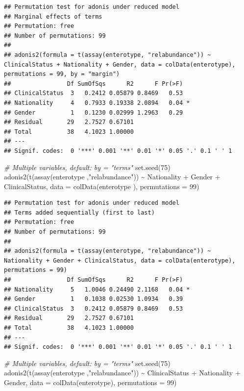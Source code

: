 \documentclass[
]{book}
\newenvironment{Shaded}{\begin{snugshade}}{\end{snugshade}}
\newcommand{\AttributeTok}[1]{\textcolor[rgb]{0.77,0.63,0.00}{#1}}
\newcommand{\CommentTok}[1]{\textcolor[rgb]{0.56,0.35,0.01}{\textit{#1}}}
\newcommand{\DecValTok}[1]{\textcolor[rgb]{0.00,0.00,0.81}{#1}}
\newcommand{\FunctionTok}[1]{\textcolor[rgb]{0.00,0.00,0.00}{#1}}
\newcommand{\NormalTok}[1]{#1}
\newcommand{\SpecialCharTok}[1]{\textcolor[rgb]{0.00,0.00,0.00}{#1}}
\newcommand{\StringTok}[1]{\textcolor[rgb]{0.31,0.60,0.02}{#1}}
\begin{document}
\begin{verbatim}
## Permutation test for adonis under reduced model
## Marginal effects of terms
## Permutation: free
## Number of permutations: 99
## 
## adonis2(formula = t(assay(enterotype, "relabundance")) ~ ClinicalStatus + Nationality + Gender, data = colData(enterotype), permutations = 99, by = "margin")
##                Df SumOfSqs      R2      F Pr(>F)  
## ClinicalStatus  3   0.2412 0.05879 0.8469   0.53  
## Nationality     4   0.7933 0.19338 2.0894   0.04 *
## Gender          1   0.1230 0.02999 1.2963   0.29  
## Residual       29   2.7527 0.67101                
## Total          38   4.1023 1.00000                
## ---
## Signif. codes:  0 '***' 0.001 '**' 0.01 '*' 0.05 '.' 0.1 ' ' 1
\end{verbatim}

\begin{Shaded}
\begin{Highlighting}[]
\CommentTok{\# Multiple variables, default: by = "terms"}
\FunctionTok{set.seed}\NormalTok{(}\DecValTok{75}\NormalTok{)}
\FunctionTok{adonis2}\NormalTok{(}\FunctionTok{t}\NormalTok{(}\FunctionTok{assay}\NormalTok{(enterotype ,}\StringTok{"relabundance"}\NormalTok{))  }\SpecialCharTok{\textasciitilde{}}\NormalTok{ Nationality }\SpecialCharTok{+}\NormalTok{ Gender }\SpecialCharTok{+}\NormalTok{ ClinicalStatus,}
        \AttributeTok{data =} \FunctionTok{colData}\NormalTok{(enterotype ),}
        \AttributeTok{permutations =} \DecValTok{99}\NormalTok{)}
\end{Highlighting}
\end{Shaded}

\begin{verbatim}
## Permutation test for adonis under reduced model
## Terms added sequentially (first to last)
## Permutation: free
## Number of permutations: 99
## 
## adonis2(formula = t(assay(enterotype, "relabundance")) ~ Nationality + Gender + ClinicalStatus, data = colData(enterotype), permutations = 99)
##                Df SumOfSqs      R2      F Pr(>F)  
## Nationality     5   1.0046 0.24490 2.1168   0.04 *
## Gender          1   0.1038 0.02530 1.0934   0.39  
## ClinicalStatus  3   0.2412 0.05879 0.8469   0.53  
## Residual       29   2.7527 0.67101                
## Total          38   4.1023 1.00000                
## ---
## Signif. codes:  0 '***' 0.001 '**' 0.01 '*' 0.05 '.' 0.1 ' ' 1
\end{verbatim}

\begin{Shaded}
\begin{Highlighting}[]
\CommentTok{\# Multiple variables, default: by = "terms"}
\FunctionTok{set.seed}\NormalTok{(}\DecValTok{75}\NormalTok{)}
\FunctionTok{adonis2}\NormalTok{(}\FunctionTok{t}\NormalTok{(}\FunctionTok{assay}\NormalTok{(enterotype ,}\StringTok{"relabundance"}\NormalTok{))  }\SpecialCharTok{\textasciitilde{}}\NormalTok{ ClinicalStatus }\SpecialCharTok{+}\NormalTok{ Nationality }\SpecialCharTok{+}\NormalTok{ Gender,}
        \AttributeTok{data =} \FunctionTok{colData}\NormalTok{(enterotype),}
        \AttributeTok{permutations =} \DecValTok{99}\NormalTok{)}
\end{Highlighting}
\end{Shaded}
\end{document}
